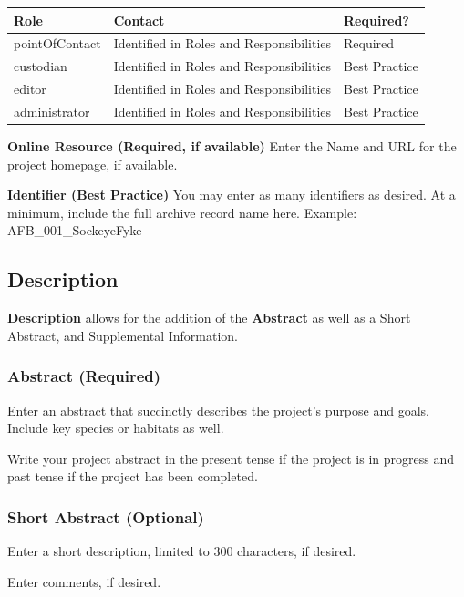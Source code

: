 \documentclass[
]{book}
\makeatletter
\newenvironment{kframe}{%
\medskip{}
\setlength{\fboxsep}{.8em}
 \def\at@end@of@kframe{}%
 \ifinner\ifhmode%
  \def\at@end@of@kframe{\end{minipage}}%
  \begin{minipage}{\columnwidth}%
 \fi\fi%
 \def\FrameCommand##1{\hskip\@totalleftmargin \hskip-\fboxsep
 \colorbox{shadecolor}{##1}\hskip-\fboxsep
     \hskip-\linewidth \hskip-\@totalleftmargin \hskip\columnwidth}%
 \MakeFramed {\advance\hsize-\width
   \@totalleftmargin\z@ \linewidth\hsize
   \@setminipage}}%
 {\par\unskip\endMakeFramed%
 \at@end@of@kframe}
\newenvironment{rmdblock}[1]
  {
  \begin{itemize}
  \renewcommand{\labelitemi}{
    \raisebox{-.7\height}[0pt][0pt]{
      {\setkeys{Gin}{width=3em,keepaspectratio}\texttt{[image: images/\#1]}}
    }
  }
  \setlength{\fboxsep}{1em}
  \begin{kframe}
  \item
  }
  {
  \end{kframe}
  \end{itemize}
  }
\newenvironment{rmdtip}
  {\begin{rmdblock}{tip}}
  {\end{rmdblock}}
\makeatother
\begin{document}
\begin{longtable}[]{@{}lll@{}}
\toprule
Role & Contact & Required?\tabularnewline
\midrule
\endhead
pointOfContact & Identified in Roles and Responsibilities & Required\tabularnewline
custodian & Identified in Roles and Responsibilities & Best Practice\tabularnewline
editor & Identified in Roles and Responsibilities & Best Practice\tabularnewline
administrator & Identified in Roles and Responsibilities & Best Practice\tabularnewline
\bottomrule
\end{longtable}

\textbf{Online Resource (Required, if available)}
Enter the Name and URL for the project homepage, if available.

\textbf{Identifier (Best Practice)}
You may enter as many identifiers as desired. At a minimum, include the full archive record name here. Example: AFB\_001\_SockeyeFyke

\hypertarget{description}{%
\subsection{Description}\label{description}}

\textbf{Description} allows for the addition of the \textbf{Abstract} as well as a Short Abstract, and Supplemental Information.

\hypertarget{abstract-required}{%
\subsubsection{Abstract (Required)}\label{abstract-required}}

Enter an abstract that succinctly describes the project's purpose and goals. Include key species or habitats as well.

\begin{rmdtip}
Write your project abstract in the present tense if the project is in
progress and past tense if the project has been completed.
\end{rmdtip}

\hypertarget{short-abstract-optional}{%
\subsubsection{Short Abstract (Optional)}\label{short-abstract-optional}}

Enter a short description, limited to 300 characters, if desired.

Enter comments, if desired.
\end{document}
